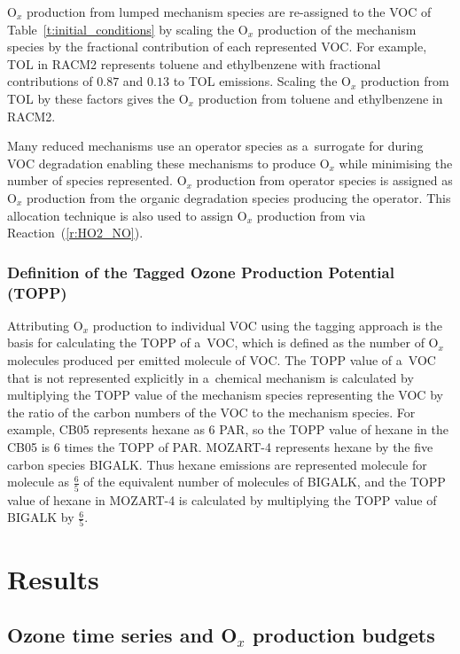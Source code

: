\documentclass[acpd, online, hvmath]{copernicus}
\begin{document}
O$_{x}$ production from lumped mechanism species are re-assigned to
the VOC of Table~\ref{t:initial_conditions} by scaling the O$_{x}$
production of the mechanism species by the fractional contribution of
each represented VOC.  For example, TOL in RACM2 represents toluene
and ethylbenzene with fractional contributions of $0.87$ and $0.13$ to
TOL emissions.  Scaling the O$_{x}$ production from TOL by these
factors gives the O$_{x}$ production from toluene and ethylbenzene
in RACM2.

Many reduced mechanisms use an operator species as a~surrogate for
 during VOC degradation enabling these mechanisms to
produce O$_{x}$ while minimising the number of  species
represented.  O$_{x}$ production from operator species is assigned
as O$_{x}$ production from the organic degradation species
producing the operator.  This allocation technique is also used to
assign O$_{x}$ production from  via
Reaction~(\ref{r:HO2_NO}).

\subsubsection{Definition of the Tagged Ozone Production Potential
  (TOPP)}
\label{sss:TOPP}

Attributing O$_{x}$ production to individual VOC using the tagging
approach is the basis for calculating the TOPP of a~VOC, which is
defined as the number of O$_{x}$ molecules produced per emitted
molecule of VOC.  The TOPP value of a~VOC that is not represented
explicitly in a~chemical mechanism is calculated by multiplying the
TOPP value of the mechanism species representing the VOC by the ratio
of the carbon numbers of the VOC to the mechanism species.  For
example, CB05 represents hexane as $6$ PAR, so the TOPP value of
hexane in the CB05 is $6$ times the TOPP of PAR.  MOZART-4 represents
hexane by the five carbon species BIGALK.  Thus hexane emissions are
represented molecule for molecule as $\frac{6}{5}$ of the equivalent
number of molecules of \mbox{BIGALK}, and the TOPP value of hexane in
MOZART-4 is calculated by multiplying the TOPP value of BIGALK by
$\frac{6}{5}$.



\section{Results}
\label{s:results}


\subsection{Ozone time series and O$_{x}$ production budgets}
\label{ss:O3_time_series}
\end{document}
